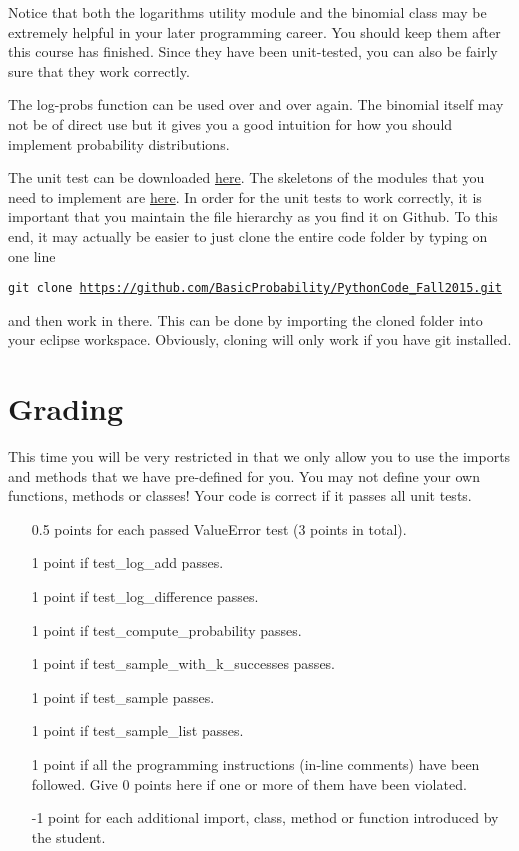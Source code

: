 \documentclass[11pt, leqno, a4paper]{article}
\begin{document}
Notice that both the logarithms utility module and the binomial class may be extremely helpful in your later
programming career. You should keep them after this course has finished. Since they have been unit-tested,
you can also be fairly sure that they work correctly.

The log-probs function can be used over and over again. The binomial itself may not be of direct use but
it gives you a good intuition for how you should implement probability distributions.

The unit test can be downloaded 
\href{https://github.com/BasicProbability/PythonCode_Fall2015/tree/master/test/week4_debugging_and_testing}{here}. The skeletons of the modules that you need to implement are 
\href{https://github.com/BasicProbability/PythonCode_Fall2015/tree/master/src/week4_debugging_and_testing}{here}. In order for the unit tests to work correctly, it is important that you maintain the file
hierarchy as you find it on Github. To this end, it may actually be easier to just clone the entire 
code folder by typing on one line
\begin{center}
\texttt{git clone \url{https://github.com/BasicProbability/PythonCode_Fall2015.git}}
\end{center}
and then work in there. This can be done by importing the cloned folder into your eclipse workspace.
Obviously, cloning will only work if you have git installed.

\section{Grading}
This time you will be very restricted in that we only allow you to use the imports and methods that
we have pre-defined for you. You may not define your own functions, methods or classes! Your code
is correct if it passes all unit tests.

\begin{itemize}
\item[0.5 points] for each passed ValueError test (3 points in total).
\item[1 point] if test\_log\_add passes.
\item[1 point] if test\_log\_difference passes.
\item[1 point] if test\_compute\_probability passes.
\item[1 point] if test\_sample\_with\_k\_successes passes.
\item[1 point] if test\_sample passes.
\item[1 point] if test\_sample\_list passes.
\item[1 point] if all the programming instructions (in-line comments) have been followed. Give 0 points here
if one or more of them have been violated.
\item[-1 point] for each additional import, class, method or function introduced by the student.
\end{itemize} 
\end{document}
